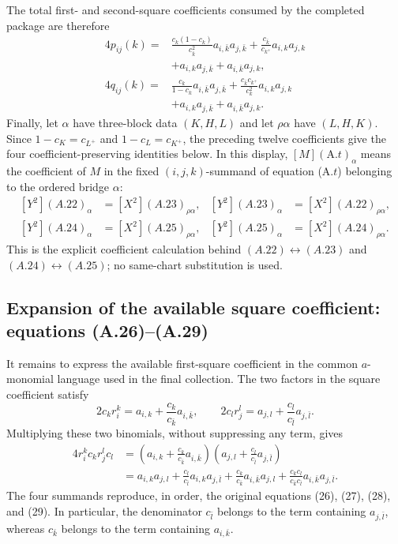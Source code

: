 \documentclass[11pt]{article}
\begin{document}
The total first- and second-square coefficients consumed by the completed
package are therefore
\[
\begin{aligned}
4p_{ij}(k)
={}&
\frac{c_k(1-c_k)}{c_{\bar k}^2}a_{i,\bar k}a_{j,\bar k}
+\frac{c_{\bar k}}{c_{k^+}}a_{i,k}a_{j,k}\\
&+a_{i,k}a_{j,\bar k}+a_{i,\bar k}a_{j,k},\\
4q_{ij}(k)
={}&
\frac{c_k}{1-c_k}a_{i,\bar k}a_{j,\bar k}
+\frac{c_{\bar k}c_{k^+}}{c_k^2}a_{i,k}a_{j,k}\\
&+a_{i,k}a_{j,\bar k}+a_{i,\bar k}a_{j,k}.
\end{aligned}
\]
Finally, let $\alpha$ have three-block data $(K,H,L)$ and let
$\rho\alpha$ have $(L,H,K)$.  Since
$1-c_K=c_{L^+}$ and $1-c_L=c_{K^+}$, the preceding twelve coefficients
give the four coefficient-preserving identities below.  In this display,
$[M](\mathrm{A.}t)_\alpha$ means the coefficient of $M$ in the fixed
$(i,j,k)$-summand of equation (A.$t$) belonging to the ordered bridge
$\alpha$:
\[
\begin{aligned}
[Y^2](A.22)_\alpha&=[X^2](A.23)_{\rho\alpha},&
[Y^2](A.23)_\alpha&=[X^2](A.22)_{\rho\alpha},\\
[Y^2](A.24)_\alpha&=[X^2](A.25)_{\rho\alpha},&
[Y^2](A.25)_\alpha&=[X^2](A.24)_{\rho\alpha}.
\end{aligned}
\]
This is the explicit coefficient calculation behind
$(A.22)\leftrightarrow(A.23)$ and
$(A.24)\leftrightarrow(A.25)$; no same-chart substitution is used.

\subsection{Expansion of the available square coefficient: equations (A.26)--(A.29)}

It remains to express the available first-square coefficient in the common
$a$-monomial language used in the final collection.
The two factors in the square coefficient satisfy
\[
2c_kr_i^k=a_{i,k}+\frac{c_k}{c_{\bar k}}a_{i,\bar k},
\qquad
2c_lr_j^l=a_{j,l}+\frac{c_l}{c_{\bar l}}a_{j,\bar l}.
\]
Multiplying these two binomials, without suppressing any term, gives
\begin{equation}\label{eq:A26to29}
\begin{aligned}
4r_i^kc_k r_j^lc_l
&=\left(a_{i,k}+\frac{c_k}{c_{\bar k}}a_{i,\bar k}\right)
  \left(a_{j,l}+\frac{c_l}{c_{\bar l}}a_{j,\bar l}\right)\\
&=a_{i,k}a_{j,l}
+\frac{c_l}{c_{\bar l}}a_{i,k}a_{j,\bar l}
+\frac{c_k}{c_{\bar k}}a_{i,\bar k}a_{j,l}
+\frac{c_kc_l}{c_{\bar k}c_{\bar l}}a_{i,\bar k}a_{j,\bar l}.
\end{aligned}
\tag{A.26--A.29}
\end{equation}
The four summands reproduce, in order, the original equations (26), (27),
(28), and (29).  In particular, the denominator $c_{\bar l}$ belongs to the
term containing $a_{j,\bar l}$, whereas $c_{\bar k}$ belongs to the term
containing $a_{i,\bar k}$.
\end{document}
